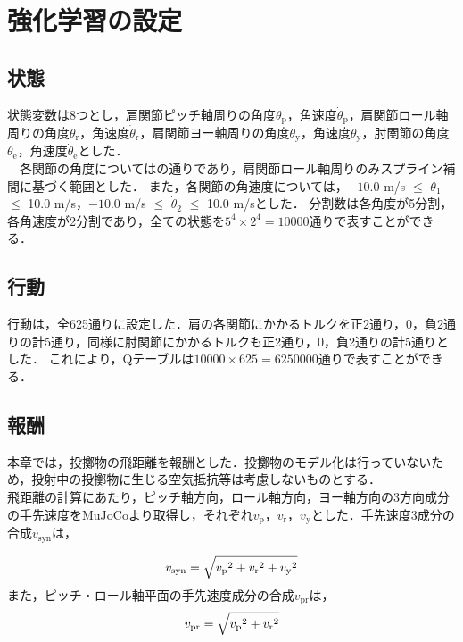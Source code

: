 \section{強化学習の設定}
\subsection{状態}
状態変数は8つとし，肩関節ピッチ軸周りの角度$\theta_{\mathrm{p}}$，角速度$\dot{\theta}_{\mathrm{p}}$，肩関節ロール軸周りの角度$\theta_{\mathrm{r}}$，角速度$\dot{\theta}_{\mathrm{r}}$，肩関節ヨー軸周りの角度$\theta_{\mathrm{y}}$，角速度$\dot{\theta}_{\mathrm{y}}$，肘関節の角度$\theta_{\mathrm{e}}$，角速度$\dot{\theta}_{\mathrm{e}}$とした．\\
　各関節の角度についてはの通りであり，肩関節ロール軸周りのみスプライン補間に基づく範囲とした．
また，各関節の角速度については，$-10.0$ m/s $\le$ $\dot{\theta}_{1}$ $\le$ 10.0 m/s，$-10.0$ m/s $\le$ $\dot{\theta}_{2}$ $\le$ 10.0 m/sとした．
分割数は各角度が5分割，各角速度が2分割であり，全ての状態を$5^{4}\times 2^{4}=10000$通りで表すことができる．
\subsection{行動}
行動は，全625通りに設定した．肩の各関節にかかるトルクを正2通り，0，負2通りの計5通り，同様に肘関節にかかるトルクも正2通り，0，負2通りの計5通りとした．
これにより，Qテーブルは$10000 \times 625=6250000$通りで表すことができる．
\subsection{報酬}
本章では，投擲物の飛距離を報酬とした．投擲物のモデル化は行っていないため，投射中の投擲物に生じる空気抵抗等は考慮しないものとする．\\
飛距離の計算にあたり，ピッチ軸方向，ロール軸方向，ヨー軸方向の3方向成分の手先速度をMuJoCoより取得し，それぞれ$v_{\mathrm{p}}$，$v_{\mathrm{r}}$，$v_{\mathrm{y}}$とした．手先速度3成分の合成$v_{\mathrm{syn}}$は，

\begin{eqnarray}
  \equlabel{5.1}
  v_{\mathrm{syn}} = \sqrt{{v_{\mathrm{p}}}^{2} + {v_{\mathrm{r}}}^{2} + {v_{\mathrm{y}}}^{2}}
\end{eqnarray}
また，ピッチ・ロール軸平面の手先速度成分の合成$v_{\mathrm{pr}}$は，
\begin{eqnarray}
  \equlabel{5.2}
  v_{\mathrm{pr}} = \sqrt{{v_{\mathrm{p}}}^{2} + {v_{\mathrm{r}}}^{2}}
\end{eqnarray}

